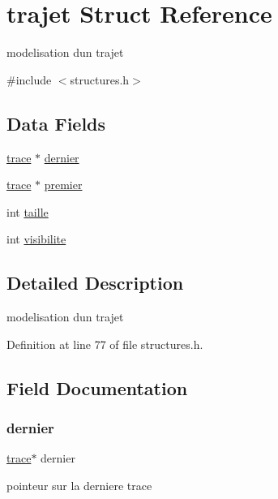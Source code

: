 \hypertarget{structtrajet}{}\section{trajet Struct Reference}
\label{structtrajet}


modelisation d\textquotesingle{}un trajet  




{\ttfamily \#include $<$structures.\+h$>$}

\subsection*{Data Fields}
\begin{DoxyCompactItemize}
\item 
\hyperlink{structtrace}{trace} $\ast$ \hyperlink{structtrajet_a0f24911c2181642cd5909d397ac74b2c}{dernier}
\item 
\hyperlink{structtrace}{trace} $\ast$ \hyperlink{structtrajet_acc04ed138412836472c25ba9913c7474}{premier}
\item 
int \hyperlink{structtrajet_a29bf3fc0ffe4e72e45f0c84ab4f8cd1e}{taille}
\item 
int \hyperlink{structtrajet_aa34b47a3ed3a7dfed8a672132bcc3f2a}{visibilite}
\end{DoxyCompactItemize}


\subsection{Detailed Description}
modelisation d\textquotesingle{}un trajet 

Definition at line 77 of file structures.\+h.



\subsection{Field Documentation}
\hypertarget{structtrajet_a0f24911c2181642cd5909d397ac74b2c}{}\label{structtrajet_a0f24911c2181642cd5909d397ac74b2c} 
\subsubsection{\texorpdfstring{dernier}{dernier}}
{\footnotesize\ttfamily \hyperlink{structtrace}{trace}$\ast$ dernier}

pointeur sur la derniere trace 

